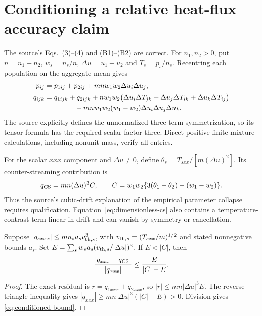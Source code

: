 \section{Conditioning a relative heat-flux accuracy claim}
\label{sec:conditioning}
The source's Eqs.~(3)--(4) and (B1)--(B2) are correct. For $n_1,n_2>0$, put
$n=n_1+n_2$, $w_s=n_s/n$, $\Delta u=u_1-u_2$ and
$T_s=p_s/n_s$. Recentring each population on the aggregate mean gives
\begin{align}
 p_{ij}&=p_{1ij}+p_{2ij}+mnw_1w_2\Delta u_i\Delta u_j,\nonumber\\
 q_{ijk}&=q_{1ijk}+q_{2ijk}
 +nw_1w_2\bigl(\Delta u_i\Delta T_{jk}
             +\Delta u_j\Delta T_{ik}+\Delta u_k\Delta T_{ij}\bigr)\nonumber\\
 &\hspace{15mm}
 -mnw_1w_2(w_1-w_2)\Delta u_i\Delta u_j\Delta u_k.
 \label{eq:mixture-correct}
\end{align}
The source explicitly defines the unnormalized three-term symmetrization,
so its tensor formula has the required scalar factor three. Direct positive
finite-mixture calculations, including nonunit mass, verify all entries.

For the scalar $xxx$ component and $\Delta u\ne0$, define
$\theta_s=T_{sxx}/[m(\Delta u)^2]$. Its counter-streaming contribution is
\begin{equation}
 q_{\rm CS}=mn(\Delta u)^3C,\qquad
 C=w_1w_2\{3(\theta_1-\theta_2)-(w_1-w_2)\}.
 \label{eq:dimensionless-cs}
\end{equation}
Thus the source's cubic-drift explanation of the empirical parameter collapse
requires qualification. Equation~\eqref{eq:dimensionless-cs} also contains a
temperature-contrast term linear in drift and can vanish by symmetry or
cancellation.

\begin{proposition}
\label{prop:conditioned-relative-bound}
Suppose $|q_{sxxx}|\le mn_s a_s v_{{\rm th},s}^3$, with
$v_{{\rm th},s}=(T_{sxx}/m)^{1/2}$ and stated nonnegative bounds $a_s$. Set
$E=\sum_s w_sa_s(v_{{\rm th},s}/|\Delta u|)^3$.
If $E<|C|$, then
\begin{equation}
 \frac{|q_{xxx}-q_{\rm CS}|}{|q_{xxx}|}
 \le\frac{E}{|C|-E}.
 \label{eq:conditioned-bound}
\end{equation}
\end{proposition}
\begin{proof}
The exact residual is $r=q_{1xxx}+q_{2xxx}$, so
$|r|\le mn|\Delta u|^3E$. The reverse triangle inequality gives
$|q_{xxx}|\ge mn|\Delta u|^3(|C|-E)>0$.
Division gives \eqref{eq:conditioned-bound}.
\end{proof}

